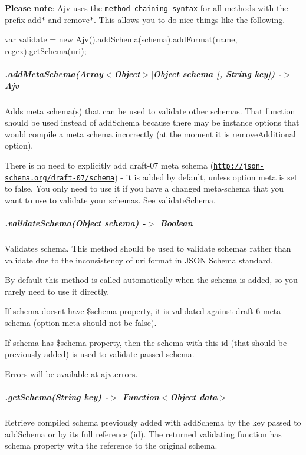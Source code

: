{\bfseries Please note}\+: Ajv uses the \href{https://en.wikipedia.org/wiki/Method_chaining}{\tt method chaining syntax} for all methods with the prefix {\ttfamily add$\ast$} and {\ttfamily remove$\ast$}. This allows you to do nice things like the following.


\begin{DoxyCode}
var validate = new Ajv().addSchema(schema).addFormat(name, regex).getSchema(uri);
\end{DoxyCode}


\subparagraph*{.add\+Meta\+Schema(Array$<$Object$>$$\vert$\+Object schema \mbox{[}, String key\mbox{]}) -\/$>$ Ajv}

Adds meta schema(s) that can be used to validate other schemas. That function should be used instead of {\ttfamily add\+Schema} because there may be instance options that would compile a meta schema incorrectly (at the moment it is {\ttfamily remove\+Additional} option).

There is no need to explicitly add draft-\/07 meta schema (\href{http://json-schema.org/draft-07/schema}{\tt http\+://json-\/schema.\+org/draft-\/07/schema}) -\/ it is added by default, unless option {\ttfamily meta} is set to {\ttfamily false}. You only need to use it if you have a changed meta-\/schema that you want to use to validate your schemas. See {\ttfamily validate\+Schema}.

\subparagraph*{\label{_api-validateschema}%
.validate\+Schema(\+Object schema) -\/$>$ Boolean}

Validates schema. This method should be used to validate schemas rather than {\ttfamily validate} due to the inconsistency of {\ttfamily uri} format in J\+S\+ON Schema standard.

By default this method is called automatically when the schema is added, so you rarely need to use it directly.

If schema doesn\textquotesingle{}t have {\ttfamily \$schema} property, it is validated against draft 6 meta-\/schema (option {\ttfamily meta} should not be false).

If schema has {\ttfamily \$schema} property, then the schema with this id (that should be previously added) is used to validate passed schema.

Errors will be available at {\ttfamily ajv.\+errors}.

\subparagraph*{.get\+Schema(\+String key) -\/$>$ Function$<$Object data$>$}

Retrieve compiled schema previously added with {\ttfamily add\+Schema} by the key passed to {\ttfamily add\+Schema} or by its full reference (id). The returned validating function has {\ttfamily schema} property with the reference to the original schema.

